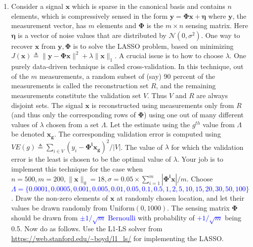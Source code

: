 \documentclass[11pt]{article}
\begin{document}
\begin{enumerate}
\item Consider a signal $\boldsymbol{x}$ which is sparse in the canonical basis and contains $n$ elements, which is compressively sensed in the form $\boldsymbol{y} = \boldsymbol{\Phi x} + \boldsymbol{\eta}$ where $\boldsymbol{y}$, the measurement vector, has $m$ elements and $\boldsymbol{\Phi}$ is the $m \times n$ sensing matrix. Here $\boldsymbol{\eta}$ is a vector of noise values that are distributed by $\mathcal{N}(0,\sigma^2)$.  One way to recover $\boldsymbol{x}$ from $\boldsymbol{y}, \boldsymbol{\Phi}$ is to solve the LASSO problem, based on minimizing $J(\boldsymbol{x}) \triangleq \|\boldsymbol{y}-\boldsymbol{\Phi x}\|^2 + \lambda \|\boldsymbol{x}\|_1$. A crucial issue is to how to choose $\lambda$. One purely data-driven technique is called cross-validation. In this technique, out of the $m$ measurements, a random subset of (say) 90 percent of the measurements is called the reconstruction set $R$, and the remaining measurements constitute the validation set $V$. Thus $V$ and $R$ are always disjoint sets. The signal $\boldsymbol{x}$ is reconstructed using measurements only from $R$ (and thus only the corresponding rows of $\boldsymbol{\Phi}$) using one out of many different values of $\lambda$ chosen from a set $\Lambda$. Let the estimate using the $g^{th}$ value from $\Lambda$ be denoted $\boldsymbol{x_g}$. The corresponding validation error is computed using $VE(g) \triangleq \sum_{i \in V} (y_i - \boldsymbol{\Phi^i x_g})^2/|V|$. The value of $\lambda$ for which the validation error is the least is chosen to be the optimal value of $\lambda$. Your job is to implement this technique for the case when $n = 500, m = 200, \|\boldsymbol{x}\|_0 = 18, \sigma = 0.05 \times \sum_{i=1}^m |\boldsymbol{\Phi^i x}| / m$. Choose \textcolor{blue}{$\Lambda = \{0.0001, 0.0005, 0.001, 0.005, 0.01, 0.05, 0.1, 0.5, 1, 2, 5, 10, 15, 20, 30, 50, 100\}$}. Draw the non-zero elements of $\boldsymbol{x}$ at randomly chosen location, and let their values be drawn randomly from $\textrm{Uniform}(0,1000)$. The sensing matrix $\boldsymbol{\Phi}$ should be drawn from \textcolor{blue}{$\pm 1/\sqrt{m} \textrm{ Bernoulli}$} with probability of \textcolor{blue}{$+1/\sqrt{m}$} being 0.5. Now do as follows. Use the L1-LS solver from \url{https://web.stanford.edu/~boyd/l1_ls/}  for implementing the LASSO. 


\end{enumerate}
\end{document}
